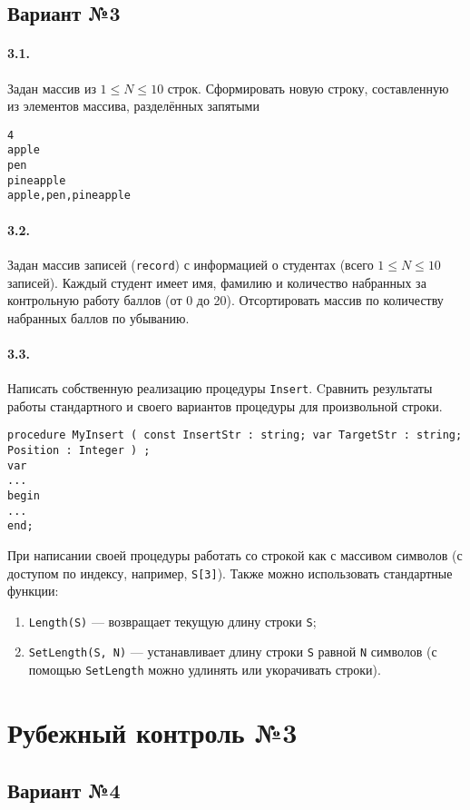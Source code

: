 \documentclass[12pt,a4paper]{report}
\begin{document}
\subsection*{Вариант №3}
\paragraph*{3.1.}
Задан массив из $1 \le N \le 10$ строк. Сформировать новую строку, составленную из элементов массива, разделённых запятыми
\begin{verbatim}
4
apple
pen
pineapple
apple,pen,pineapple
\end{verbatim}
\paragraph*{3.2.}
Задан массив записей (\texttt{record}) с информацией о студентах (всего $ 1 \le N \le 10 $ записей). Каждый студент имеет имя, фамилию и количество набранных за контрольную работу баллов (от 0 до 20).
Отсортировать массив по количеству набранных баллов по убыванию.
\paragraph*{3.3.}
Написать собственную реализацию процедуры \texttt{Insert}. Cравнить результаты работы стандартного и своего вариантов процедуры для произвольной строки.
\begin{verbatim}
procedure MyInsert ( const InsertStr : string; var TargetStr : string; Position : Integer ) ;
var
...
begin
...
end;
\end{verbatim}
При написании своей процедуры работать со строкой как с массивом символов (с доступом по индексу, например, \texttt{S[3]}). Также можно использовать стандартные функции:
\begin{enumerate}
\item \texttt{Length(S)} --- возвращает текущую длину строки \texttt{S};
\item \texttt{SetLength(S, N)} --- устанавливает длину строки \texttt{S} равной \texttt{N} символов (с помощью \texttt{SetLength} можно удлинять или укорачивать строки).
\end{enumerate}

\clearpage
\section*{Рубежный контроль №3}
\subsection*{Вариант №4}
\end{document}
